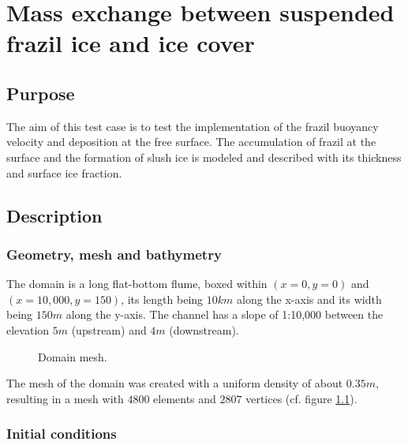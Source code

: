 \renewcommand{\labelitemi}{$\triangleright$}

\chapter{Mass exchange between suspended frazil ice and ice cover}
%
%
\section{Purpose}

The aim of this test case is to test the implementation of the frazil buoyancy velocity and deposition at the free surface. 
The accumulation of frazil at the surface and the formation of slush ice is modeled and described with its thickness and surface ice fraction.

\section{Description}

\subsection{Geometry, mesh and bathymetry}
The domain is a long flat-bottom flume, boxed within $(x=0, y=0)$ and $(x=10,000, y=150)$, its length being $10km$ along the x-axis and its width being $150m$ along the y-axis. The channel has a slope of 1:10,000 between the elevation $5m$ (upstream) and $4m$ (downstream).

\begin{figure}[H]
    \begin{center}
    \end{center}
    \caption{Domain mesh.}
    \label{fig:prec_mesh}
\end{figure}

The mesh of the domain was created with a uniform density of about $0.35m$, resulting in a mesh with $4800$ elements and $2807$ vertices (cf. figure \ref{fig:prec_mesh}).

\subsection{Initial conditions}


